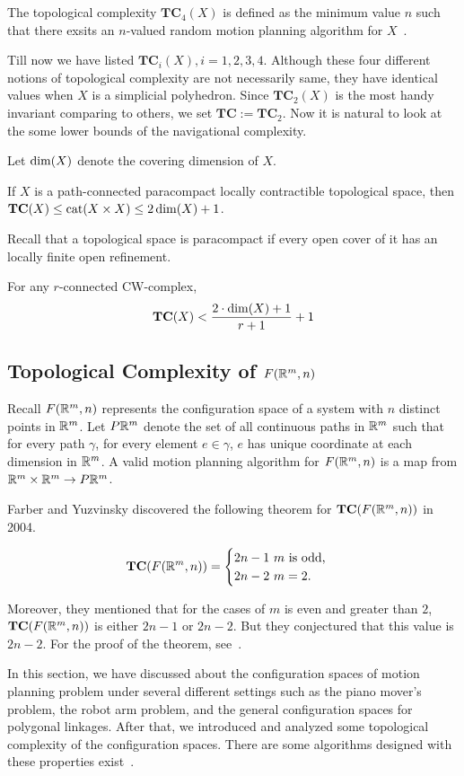 \begin{definition}
  The topological complexity \(\mathbf{TC}_4(X)\) is defined as the minimum value \(n\) such that there exsits an \(n\)-valued random motion planning algorithm for \(X\)~\cite{farber2006topology}.
\end{definition}

Till now we have listed \(\mathbf{TC}_i(X),i=1,2,3,4\). Although these four different notions of topological complexity are not necessarily same, they have identical values when \(X\) is a simplicial polyhedron. Since \(\mathbf{TC}_2(X)\) is the most handy invariant comparing to others, we set \(\mathbf{TC}:=\mathbf{TC}_2\).
Now it is natural to look at the some lower bounds of the navigational complexity.

Let \(\operatorname{dim}(X)\) denote the covering dimension of \(X\).
\begin{theorem}
If \(X\) is a path-connected paracompact locally contractible topological space, then \(\mathbf{TC}(X)\le \operatorname{cat}(X\times X)\le 2\operatorname{dim}(X)+1\).
\end{theorem}
Recall that a topological space is paracompact if every open cover of it has an locally finite open refinement.
\begin{theorem}
  For any \(r\)-connected CW-complex,
  \[\mathbf{TC}(X)<\frac{2\cdot\operatorname{dim}(X)+1}{r+1}+1\]
\end{theorem}

\subsection{Topological Complexity of \(F(\mathbb{R}^m,n)\)}
Recall \(F(\mathbb{R}^m,n)\) represents the configuration space of a system with \(n\) distinct points in \(\mathbb{R}^m\).
Let \(P\mathbb{R}^m\) denote the set of all continuous paths in \(\mathbb{R}^m\) such that for every path \(\gamma\), for every element \(e\in \gamma\), \(e\) has unique coordinate at each dimension in \(\mathbb{R}^m\).
A valid motion planning algorithm for \(F(\mathbb{R}^m,n)\) is a map from \(\mathbb{R}^m\times \mathbb{R}^m\to P\mathbb{R}^m\).

Farber and Yuzvinsky discovered the following theorem for \(\mathbf{TC}(F(\mathbb{R}^m,n))\) in 2004.
\begin{theorem}
  \[\mathbf{TC}(F(\mathbb{R}^m,n))=\begin{cases}
      2n-1 \text{ \(m\) is odd,}\\
      2n-2 \text{ \(m=2\)}.
    \end{cases}\]
\end{theorem}
Moreover, they mentioned that for the cases of \(m\) is even and greater than \(2\), \(\mathbf{TC}(F(\mathbb{R}^m,n))\) is either \(2n-1\) or \(2n-2\). But they conjectured that this value is \(2n-2\). For the proof of the theorem, see~\cite{farber2004topological}.

In this section, we have discussed about the configuration spaces of motion planning problem under several different settings such as the piano mover's problem, the robot arm problem, and the general configuration spaces for polygonal linkages. After that, we introduced and analyzed some topological complexity of the configuration spaces. There are some algorithms designed with these properties exist~\cite{farber2006topology}.